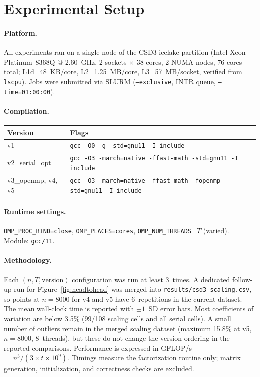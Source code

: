 \documentclass{article}
\begin{document}
\section{Experimental Setup}

\paragraph{Platform.}
All experiments ran on a single node of the CSD3 icelake partition
(Intel Xeon Platinum~8368Q @ 2.60~GHz, 2 sockets $\times$ 38 cores, 2 NUMA
nodes, 76 cores total; L1d=48~KB/core, L2=1.25~MB/core, L3=57~MB/socket,
verified from \texttt{lscpu}).
Jobs were submitted via SLURM (\texttt{--exclusive}, INTR queue,
\texttt{--time=01:00:00}).

\paragraph{Compilation.}
\begin{center}
\begin{tabular}{ll}
\toprule
Version & Flags \\
\midrule
v1 & \texttt{gcc -O0 -g -std=gnu11 -I include} \\
v2\_serial\_opt & \texttt{gcc -O3 -march=native -ffast-math -std=gnu11 -I include} \\
v3\_openmp, v4, v5 & \texttt{gcc -O3 -march=native -ffast-math -fopenmp -std=gnu11 -I include} \\
\bottomrule
\end{tabular}
\end{center}

\paragraph{Runtime settings.}
\texttt{OMP\_PROC\_BIND=close}, \texttt{OMP\_PLACES=cores},
\texttt{OMP\_NUM\_THREADS}=$T$ (varied).
Module: \texttt{gcc/11}.

\paragraph{Methodology.}
Each $(n, T, \text{version})$ configuration was run at least 3~times.
A dedicated follow-up run for Figure~\ref{fig:headtohead} was merged into
\texttt{results/csd3\_scaling.csv}, so points at $n=8000$ for v4 and v5 have
6~repetitions in the current dataset.
The mean wall-clock time is reported with $\pm1$~SD error bars.
Most coefficients of variation are below 3.5\%
(99/108 scaling cells and all serial cells).
A small number of outliers remain in the merged scaling dataset
(maximum 15.8\% at v5, $n=8000$, 8~threads), but these do not change the
version ordering in the reported comparisons.
Performance is expressed in GFLOP/s $= n^3/(3 \times t \times 10^9)$.
Timings measure the factorization routine only; matrix generation,
initialization, and correctness checks are excluded.
\end{document}
